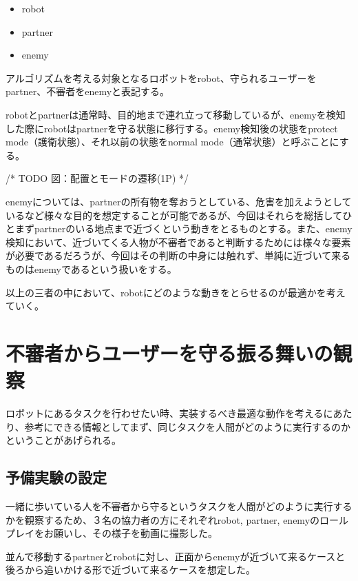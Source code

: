 \documentclass{kuisthesis}
\begin{document}
\begin{itemize}
	\item robot
	\item partner
	\item enemy
\end{itemize}

アルゴリズムを考える対象となるロボットをrobot、守られるユーザーをpartner、不審者をenemyと表記する。

robotとpartnerは通常時、目的地まで連れ立って移動しているが、enemyを検知した際にrobotはpartnerを守る状態に移行する。enemy検知後の状態をprotect mode（護衛状態）、それ以前の状態をnormal mode（通常状態）と呼ぶことにする。

/* TODO 図：配置とモードの遷移(1P) */

enemyについては、partnerの所有物を奪おうとしている、危害を加えようとしているなど様々な目的を想定することが可能であるが、今回はそれらを総括してひとまずpartnerのいる地点まで近づくという動きをとるものとする。また、enemy検知において、近づいてくる人物が不審者であると判断するためには様々な要素が必要であるだろうが、今回はその判断の中身には触れず、単純に近づいて来るものはenemyであるという扱いをする。

以上の三者の中において、robotにどのような動きをとらせるのが最適かを考えていく。






\section{不審者からユーザーを守る振る舞いの観察}

ロボットにあるタスクを行わせたい時、実装するべき最適な動作を考えるにあたり、参考にできる情報としてまず、同じタスクを人間がどのように実行するのかということがあげられる。

\subsection{予備実験の設定}

一緒に歩いている人を不審者から守るというタスクを人間がどのように実行するかを観察するため、３名の協力者の方にそれぞれrobot, partner, enemyのロールプレイをお願いし、その様子を動画に撮影した。

並んで移動するpartnerとrobotに対し、正面からenemyが近づいて来るケースと後ろから追いかける形で近づいて来るケースを想定した。
\end{document}
